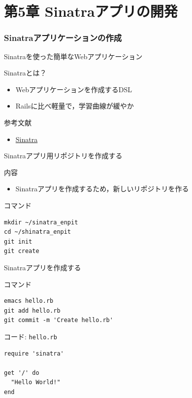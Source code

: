 \documentclass[t, aspectratio=169]{beamer}
\begin{document}
\part{第5章 Sinatraアプリの開発}
\label{sec-5}
\section{Sinatraアプリケーションの作成}
\label{sec-5-1}
\begin{frame}[label=sec-5-1-1]{Sinatraを使った簡単なWebアプリケーション}
\begin{block}{Sinatraとは？}
\begin{itemize}
\item Webアプリケーションを作成するDSL
\item Railsに比べ軽量で，学習曲線が緩やか
\end{itemize}
\end{block}
\begin{block}{参考文献}
\begin{itemize}
\item \href{http://www.sinatrarb.com/}{Sinatra}
\end{itemize}
\end{block}
\end{frame}

\begin{frame}[fragile,label=sec-5-1-2]{Sinatraアプリ用リポジトリを作成する}
 \begin{block}{内容}
\begin{itemize}
\item Sinatraアプリを作成するため，新しいリポジトリを作る
\end{itemize}
\end{block}
\begin{block}{コマンド}
\begin{verbatim}
mkdir ~/sinatra_enpit
cd ~/shinatra_enpit
git init
git create
\end{verbatim}
\end{block}
\end{frame}

\begin{frame}[fragile,label=sec-5-1-3]{Sinatraアプリを作成する}
 \begin{block}{コマンド}
\begin{verbatim}
emacs hello.rb
git add hello.rb
git commit -m 'Create hello.rb'
\end{verbatim}
\end{block}

\begin{block}{コード: \texttt{hello.rb}}
\begin{verbatim}
require 'sinatra'

get '/' do
  "Hello World!"
end
\end{verbatim}
\end{block}
\end{frame}
\end{document}
